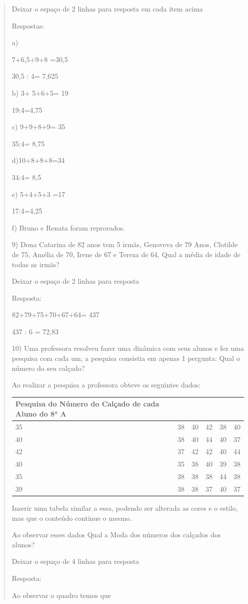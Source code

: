 \begin{quote}
\begin{escolha}
Deixar o espaço de 2 linhas para resposta em cada item acima

Respostas:

a)

7+6,5+9+8 =30,5

30,5 : 4= 7,625

b) 3+ 5+6+5= 19

19:4=4,75

c) 9+9+8+9= 35

35:4= 8,75

d)10+8+8+8=34

34:4= 8,5

e) 5+4+5+3 =17

17:4=4,25

f) Bruno e Renata foram reprovados.

9) Dona Catarina de 82 anos tem 5 irmãs, Genoveva de 79 Anos, Clotilde
de 75, Amélia de 70, Irene de 67 e Tereza de 64, Qual a média de idade
de todas as irmãs?

Deixar o espaço de 2 linhas para resposta

Resposta:

82+79+75+70+67+64= 437

437 : 6 = 72,83

10) Uma professora resolveu fazer uma dinâmica com seus alunos e fez uma
pesquisa com cada um, a pesquisa consistia em apenas 1 pergunta: Qual o
número do seu calçado?

Ao realizar a pesquisa a professora obteve os seguintes dados:

\begin{longtable}[]{@{}llllll@{}}
\toprule
Pesquisa do Número do Calçado de cada Aluno do 8° A & & & &
&\tabularnewline
\midrule
\endhead
35 & 38 & 40 & 42 & 38 & 40\tabularnewline
40 & 38 & 40 & 44 & 40 & 37\tabularnewline
42 & 37 & 42 & 42 & 40 & 44\tabularnewline
40 & 35 & 38 & 40 & 39 & 38\tabularnewline
35 & 38 & 38 & 38 & 44 & 38\tabularnewline
39 & 38 & 38 & 37 & 40 & 37\tabularnewline
\bottomrule
\end{longtable}

Inserir uma tabela similar a essa, podendo ser alterada as cores e o
estilo, mas que o conteúdo continue o mesmo.

Ao observar esses dados Qual a Moda dos números dos calçados dos alunos?

Deixar o espaço de 4 linhas para resposta

Resposta:

Ao observar o quadro temos que


\end{escolha}
\end{quote}
